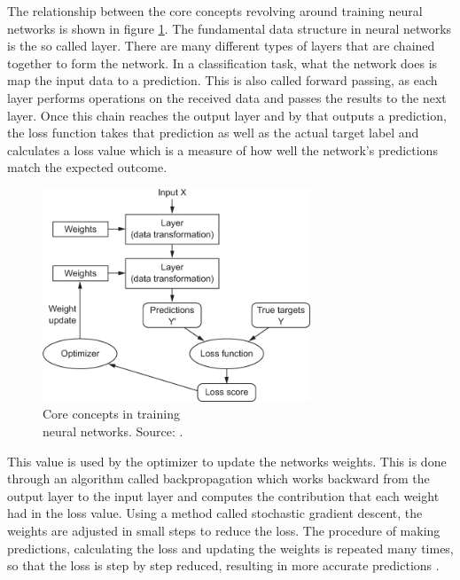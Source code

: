 \begin{minipage}{0.45\textwidth}
	The relationship between the core concepts revolving around training neural networks is shown in figure \ref{fig:nn_comp}. The fundamental data structure in neural networks is the so called layer. There are many different types of layers that are chained together to form the network. In a classification task, what the network does is map the input data to a prediction. This is also called forward passing, as each layer performs operations on the received data and passes the results to the next layer. Once this chain reaches the output layer and by that outputs a prediction, the loss function takes that prediction as well as the actual target label and calculates a loss value which is a measure of how well the network's predictions match the expected outcome. 
\end{minipage}
\begin{minipage}{0.55\textwidth}
	\begin{figure}[H]
		\centering
		\includegraphics[width=8cm]{images/nn/comp.jpg}
		\caption[Core concepts in training neural networks.]{Core concepts in training\\\hspace{0\textwidth} neural networks. Source: \cite[Chapter~3]{cnn}.}
		\label{fig:nn_comp}
	\end{figure}
\end{minipage}

This value is used by the optimizer to update the networks weights. This is done through an algorithm called backpropagation which works backward from the output layer to the input layer and computes the contribution that each weight had in the loss value. Using a method called stochastic gradient descent, the weights are adjusted in small steps to reduce the loss. The procedure of making predictions, calculating the loss and updating the weights is repeated many times, so that the loss is step by step reduced, resulting in more accurate predictions \cite[Chapter~3]{cnn}.



